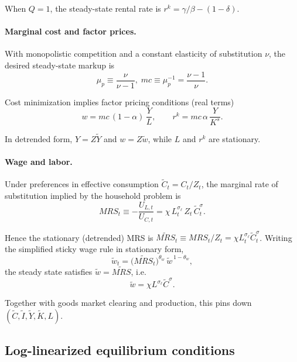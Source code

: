 When $Q=1$, the steady-state rental rate is $r^k = \gamma/\beta-(1-\delta)$.

\paragraph{Marginal cost and factor prices.}
With monopolistic competition and a constant elasticity of substitution $\nu$, the desired steady-state markup is
\begin{equation}
	\mu_p \equiv \frac{\nu}{\nu-1},\; mc \equiv \mu_p^{-1}=\frac{\nu-1}{\nu}.
\end{equation}

Cost minimization implies factor pricing conditions (real terms)
\begin{equation}
	w = mc\,(1-\alpha)\,\frac{Y}{L},\qquad r^k = mc\,\alpha\,\frac{Y}{K^s}.
\end{equation}

In detrended form, $Y=Z\tilde Y$ and $w=Z\tilde w$, while $L$ and $r^k$ are stationary.

\paragraph{Wage and labor.}
Under preferences in effective consumption $\tilde C_t=C_t/Z_t$, the marginal rate of substitution implied by the household problem is
\begin{equation}
	MRS_t\equiv-\frac{U_{L,t}}{U_{C,t}}=\chi\,L_t^{\sigma_\ell}\,Z_t\,\tilde C_t^{\sigma}.
\end{equation}

Hence the stationary (detrended) MRS is $\widetilde{MRS}_t\equiv MRS_t/Z_t=\chi L_t^{\sigma_\ell}\tilde C_t^{\sigma}$.
Writing the simplified sticky wage rule in stationary form,
\begin{equation}
	\tilde w_t = \big(\widetilde{MRS}_t\big)^{\theta_w}\,\tilde w^{\,1-\theta_w},
\end{equation}
the steady state satisfies $\tilde w=\widetilde{MRS}$, i.e.
\begin{equation}
	\tilde w = \chi L^{\sigma_\ell}\tilde C^{\sigma}.
\end{equation}

Together with goods market clearing and production, this pins down $(\tilde C,\tilde I,\tilde Y,\tilde K,L)$.

\subsection{Log-linearized equilibrium conditions}
\label{app:loglin}

